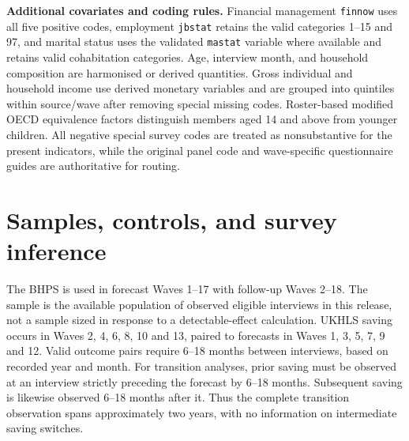 \textbf{Additional covariates and coding rules.} Financial management \texttt{finnow} uses all five positive codes, employment \texttt{jbstat} retains the valid categories 1--15 and 97, and marital status uses the validated \texttt{mastat} variable where available and retains valid cohabitation categories. Age, interview month, and household composition are harmonised or derived quantities. Gross individual and household income use derived monetary variables and are grouped into quintiles within source/wave after removing special missing codes. Roster-based modified OECD equivalence factors distinguish members aged 14 and above from younger children. All negative special survey codes are treated as nonsubstantive for the present indicators, while the original panel code and wave-specific questionnaire guides are authoritative for routing.



\section{Samples, controls, and survey inference}\label{sec:samples}

The BHPS is used in forecast Waves 1--17 with follow-up Waves 2--18. The sample is the available population of observed eligible interviews in this release, not a sample sized in response to a detectable-effect calculation. UKHLS saving occurs in Waves 2, 4, 6, 8, 10 and 13, paired to forecasts in Waves 1, 3, 5, 7, 9 and 12. Valid outcome pairs require 6--18 months between interviews, based on recorded year and month. For transition analyses, prior saving must be observed at an interview strictly preceding the forecast by 6--18 months. Subsequent saving is likewise observed 6--18 months after it. Thus the complete transition observation spans approximately two years, with no information on intermediate saving switches.

